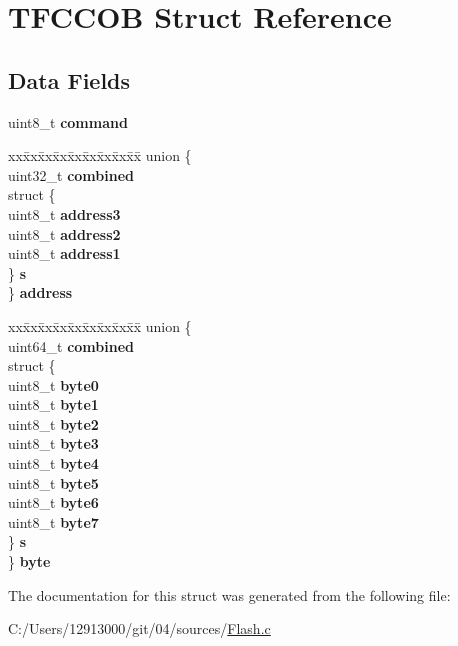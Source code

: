 \hypertarget{struct_t_f_c_c_o_b}{}\section{T\+F\+C\+C\+O\+B Struct Reference}
\label{struct_t_f_c_c_o_b}
\subsection*{Data Fields}
\begin{DoxyCompactItemize}
\item 
\hypertarget{struct_t_f_c_c_o_b_a10fcae51f3423d538c5b1fa39ca7401b}{}uint8\+\_\+t {\bfseries command}\label{struct_t_f_c_c_o_b_a10fcae51f3423d538c5b1fa39ca7401b}

\item 
\hypertarget{struct_t_f_c_c_o_b_a3ac8db34f36543265093809f2ce123b9}{}\begin{tabbing}
xx\=xx\=xx\=xx\=xx\=xx\=xx\=xx\=xx\=\kill
union \{\\
\>uint32\_t {\bfseries combined}\\
\>struct \{\\
\>\>uint8\_t {\bfseries address3}\\
\>\>uint8\_t {\bfseries address2}\\
\>\>uint8\_t {\bfseries address1}\\
\>\} {\bfseries s}\\
\} {\bfseries address}\label{struct_t_f_c_c_o_b_a3ac8db34f36543265093809f2ce123b9}
\\

\end{tabbing}\item 
\hypertarget{struct_t_f_c_c_o_b_a5a229be4c57e649fe89e08b8c27d3dcc}{}\begin{tabbing}
xx\=xx\=xx\=xx\=xx\=xx\=xx\=xx\=xx\=\kill
union \{\\
\>uint64\_t {\bfseries combined}\\
\>struct \{\\
\>\>uint8\_t {\bfseries byte0}\\
\>\>uint8\_t {\bfseries byte1}\\
\>\>uint8\_t {\bfseries byte2}\\
\>\>uint8\_t {\bfseries byte3}\\
\>\>uint8\_t {\bfseries byte4}\\
\>\>uint8\_t {\bfseries byte5}\\
\>\>uint8\_t {\bfseries byte6}\\
\>\>uint8\_t {\bfseries byte7}\\
\>\} {\bfseries s}\\
\} {\bfseries byte}\label{struct_t_f_c_c_o_b_a5a229be4c57e649fe89e08b8c27d3dcc}
\\

\end{tabbing}\end{DoxyCompactItemize}


The documentation for this struct was generated from the following file\+:\begin{DoxyCompactItemize}
\item 
C\+:/\+Users/12913000/git/04/sources/\hyperlink{_flash_8c}{Flash.\+c}\end{DoxyCompactItemize}
